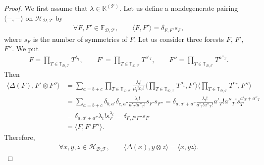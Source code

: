 \documentclass[10pt,a4paper]{amsart}
\numberwithin{equation}{section}
\newcommand{\K}{\mathbb{K}}
\newcommand{\T}{\mathcal{T}}
\newcommand{\D}{\mathcal{D}}
\newcommand{\h}{\mathcal{H}}
\newcommand{\bfT}{\mathbb{T}}
\newcommand{\bfF}{\mathbb{F}}
\begin{document}
\begin{proof} We first assume that $\lambda\in \K^{(\T)}$.
Let us define a nondegenerate pairing $\langle-,-\rangle$ on $\h_{\D,\T}$ by
\begin{gather*}
\forall F,F'\in \bfF_{\D,\T},\qquad \langle F, F'\rangle=\delta_{F,F'}s_F,
\end{gather*}
where $s_F$ is the number of symmetries of $F$.
Let us consider three forests $F$, $F'$, $F''$. We put
\begin{gather*}
F=\prod_{T\in \bfT_{\D,\T}} T^{\lambda_t},\qquad
F'=\prod_{T\in \bfT_{\D,\T}} T^{a'_T},\qquad
F''=\prod_{T\in \bfT_{\D,\T}} T^{a''_T}.
\end{gather*}
Then
\begin{align*}
\langle \Delta(F),F'\otimes F''\rangle&=\sum_{a=b+c} \prod_{T\in\bfT_{\D,\T}}\frac{\lambda_t!}{\mu_t!c_T!}
\bigg\langle \prod_{T\in \bfT_{\D,\T}} T^{\mu_t},F'\bigg\rangle \bigg\langle \prod_{T\in \bfT_{\D,\T}} T^{c_T},F''\bigg\rangle
\\
 &=\sum_{a=b+c}\delta_{b,a'}\delta_{c,a''}\frac{\lambda_t!}{a'_T!a''_T!} s_{F'}s_{F''}
=\delta_{a,a'+a''}\frac{\lambda_t!}{a'_T!a''_T!} a'_T!a''_T! s_{T}^{a'_T+a''_T}
 \\
 &=\delta_{a,a'+a''}\lambda_t!s_{T}^{\lambda_t}
=\delta_{F,F'F''}s_F
\\
&=\langle F,F'F''\rangle.
\end{align*}
Therefore,
\begin{gather*}
\forall x,y,z\in \h_{\D,\T},\qquad \langle \Delta(x),y\otimes z\rangle=\langle x,yz\rangle.
\end{gather*}


\end{proof}
\end{document}
